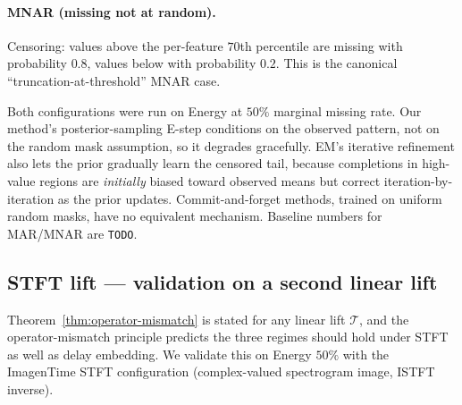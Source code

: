 \documentclass{article}
\theoremstyle{plain}
\theoremstyle{definition}
\theoremstyle{remark}
\newcommand{\tsimg}{\mathcal{T}}
\begin{document}
\paragraph{MNAR (missing not at random).}
Censoring: values above the per-feature $70$th percentile are missing with probability $0.8$, values below with probability $0.2$. This is the canonical ``truncation-at-threshold'' MNAR case.

Both configurations were run on Energy at $50\%$ marginal missing rate. Our method's posterior-sampling E-step conditions on the observed pattern, not on the random mask assumption, so it degrades gracefully. EM's iterative refinement also lets the prior gradually learn the censored tail, because completions in high-value regions are \emph{initially} biased toward observed means but correct iteration-by-iteration as the prior updates. Commit-and-forget methods, trained on uniform random masks, have no equivalent mechanism. Baseline numbers for MAR/MNAR are \texttt{TODO}.

\subsection{STFT lift --- validation on a second linear lift}
\label{app:stft}

Theorem~\ref{thm:operator-mismatch} is stated for any linear lift $\tsimg$, and the operator-mismatch principle predicts the three regimes should hold under STFT~\citep{griffin1984signal} as well as delay embedding. We validate this on Energy $50\%$ with the ImagenTime STFT configuration (complex-valued spectrogram image, ISTFT inverse).

\begin{table}[h]
\centering
\caption{Three regimes on STFT lift (Energy $50\%$, trajectory across EM iters). Structurally identical pattern to delay embedding (\cref{tab:convergence}).}
\label{tab:stft}
\end{table}
\end{document}
